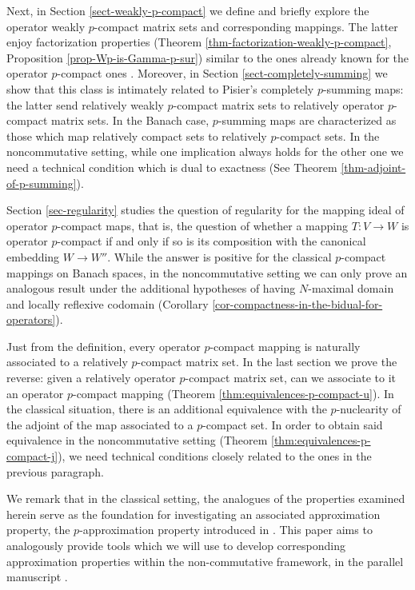 \documentclass[11pt]{amsart}
\numberwithin{equation}{section}
\begin{document}
Next, in Section \ref{sect-weakly-p-compact} we define and briefly explore the operator weakly $p$-compact matrix sets and corresponding mappings. The latter enjoy factorization properties (Theorem \ref{thm-factorization-weakly-p-compact}, Proposition \ref{prop-Wp-is-Gamma-p-sur}) similar to the ones already known for the operator $p$-compact ones \cite{ChaDiGa-Operator-p-compact}.
Moreover, in Section \ref{sect-completely-summing} we show that this class is intimately related to Pisier's completely $p$-summing maps: the latter send relatively weakly $p$-compact matrix sets to relatively operator $p$-compact matrix sets.
In the Banach case, $p$-summing maps are characterized as those which map relatively compact sets to relatively $p$-compact sets. In the noncommutative setting, while one implication always holds for the other one we need a technical condition which is dual to exactness (See Theorem \ref{thm-adjoint-of-p-summing}).

Section \ref{sec-regularity} studies the question of regularity for the mapping ideal of operator $p$-compact maps, that is, the question of whether a mapping $T : V \to W$ is operator $p$-compact if and only if so is its composition with the canonical embedding $W \to W''$. While the answer is positive for the classical $p$-compact mappings on Banach spaces, in the noncommutative setting we can only prove an analogous result under the additional hypotheses of having $N$-maximal domain and locally reflexive codomain (Corollary \ref{cor-compactness-in-the-bidual-for-operators}).


Just from the definition, every operator $p$-compact mapping is naturally associated to a relatively $p$-compact matrix set. In the last section we prove the reverse: given a relatively operator $p$-compact matrix set, can we associate to it an operator $p$-compact mapping (Theorem \ref{thm:equivalences-p-compact-u}). In the classical situation, there is an additional equivalence with the $p$-nuclearity of the adjoint of the map associated to a $p$-compact set. In order to obtain said equivalence in the noncommutative setting (Theorem \ref{thm:equivalences-p-compact-j}), we need technical conditions closely related to the ones in the previous paragraph.


We remark that in the classical setting, the analogues of the properties examined herein serve as the foundation for investigating an associated approximation property, the $p$-approximation property introduced in \cite{Sinha-Karn}. This paper aims to analogously  provide tools which we will use to develop corresponding approximation properties within the non-commutative framework, in the parallel manuscript \cite{CDDG-pOAP}.
\end{document}
